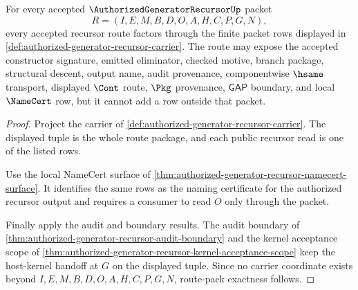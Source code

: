 \begin{theorem}
\label{thm:authorized-generator-recursor-route-pack-exactness}
For every accepted $\AuthorizedGeneratorRecursorUp$ packet
$$
R=(I,E,M,B,D,O,A,H,C,P,G,N),
$$
every accepted recursor route factors through the finite packet rows displayed
in \autoref{def:authorized-generator-recursor-carrier}. The route may expose
the accepted constructor signature, emitted eliminator, checked motive, branch
package, structural descent, output name, audit provenance, componentwise
$\hsame$ transport, displayed $\Cont$ route, $\Pkg$ provenance, $\mathsf{GAP}$
boundary, and local $\NameCert$ row, but it cannot add a row outside that
packet.
\end{theorem}
\begin{proof}
Project the carrier of
\autoref{def:authorized-generator-recursor-carrier}. The displayed tuple is the
whole route package, and each public recursor read is one of the listed rows.

Use the local NameCert surface of
\autoref{thm:authorized-generator-recursor-namecert-surface}. It identifies the
same rows as the naming certificate for the authorized recursor output and
requires a consumer to read $O$ only through the packet.

Finally apply the audit and boundary results. The audit boundary of
\autoref{thm:authorized-generator-recursor-audit-boundary} and the kernel
acceptance scope of
\autoref{thm:authorized-generator-recursor-kernel-acceptance-scope} keep the
host-kernel handoff at $G$ on the displayed tuple. Since no carrier coordinate
exists beyond $I,E,M,B,D,O,A,H,C,P,G,N$, route-pack exactness follows.
\end{proof}

